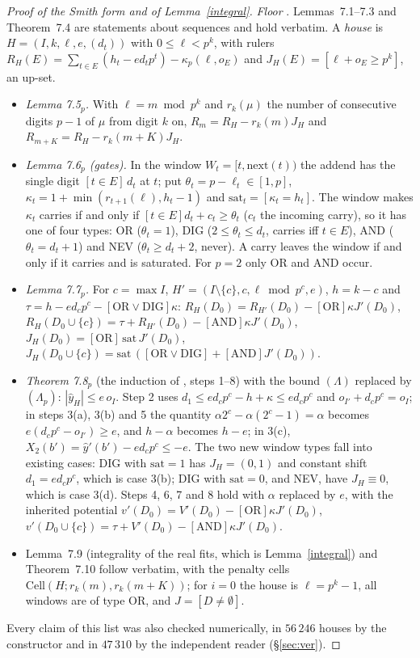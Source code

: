 \documentclass[10pt]{article}
\theoremstyle{ds}
\theoremstyle{dsrem}
\begin{document}
\begin{proof}[Proof of the Smith form and of Lemma~\ref{integral}]
\emph{Floor} \cite[\S7]{DST}. Lemmas~7.1--7.3 and Theorem~7.4 are statements about sequences and hold verbatim. A \emph{house} is $H=(I,k,\ell,e,(d_t))$ with $0\le\ell<p^k$, with rulers $R_H(E)=\sum_{t\in E}(h_t-ed_tp^t)-\kappa_p(\ell,o_E)$ and $J_H(E)=[\ell+o_E\ge p^k]$, an up-set.
\begin{itemize}
\item \emph{Lemma 7.5$_p$.} With $\ell=m\bmod p^k$ and $r_k(\mu)$ the number of consecutive digits $p-1$ of $\mu$ from digit $k$ on, $R_m=R_H-r_k(m)J_H$ and $R_{m+K}=R_H-r_k(m+K)J_H$.
\item \emph{Lemma 7.6$_p$ (gates).} In the window $W_t=[t,\mathrm{next}(t))$ the addend has the single digit $[t\in E]\,d_t$ at $t$; put $\theta_t=p-\ell_t\in[1,p]$, $\kappa_t=1+\min(r_{t+1}(\ell),h_t-1)$ and $\mathrm{sat}_t=[\kappa_t=h_t]$. The window makes $\kappa_t$ carries if and only if $[t\in E]d_t+c_t\ge\theta_t$ ($c_t$ the incoming carry), so it has one of four types: OR ($\theta_t=1$), DIG ($2\le\theta_t\le d_t$, carries iff $t\in E$), AND ($\theta_t=d_t+1$) and NEV ($\theta_t\ge d_t+2$, never). A carry leaves the window if and only if it carries and is saturated. For $p=2$ only OR and AND occur.
\item \emph{Lemma 7.7$_p$.} For $c=\max I$, $H'=(I\setminus\{c\},c,\ell\bmod p^c,e)$, $h=k-c$ and $\tau=h-ed_cp^c-[\mathrm{OR}\vee\mathrm{DIG}]\kappa$:
$R_H(D_0)=R_{H'}(D_0)-[\mathrm{OR}]\kappa J'(D_0)$, $R_H(D_0\cup\{c\})=\tau+R_{H'}(D_0)-[\mathrm{AND}]\kappa J'(D_0)$, $J_H(D_0)=[\mathrm{OR}]\,\mathrm{sat}\,J'(D_0)$, $J_H(D_0\cup\{c\})=\mathrm{sat}\,([\mathrm{OR}\vee\mathrm{DIG}]+[\mathrm{AND}]J'(D_0))$.
\item \emph{Theorem 7.8$_p$} (the induction of \cite[Theorem~7.8]{DST}, steps 1--8) with the bound $(\Lambda)$ replaced by $(\Lambda_p)$: $|\hat y_H|\le e\,o_I$. Step 2 uses $d_1\le ed_cp^c-h+\kappa\le ed_cp^c$ and $o_{I'}+d_cp^c=o_I$; in steps 3(a), 3(b) and 5 the quantity $\alpha2^c-\alpha(2^c-1)=\alpha$ becomes $e(d_cp^c-o_{I'})\ge e$, and $h-\alpha$ becomes $h-e$; in 3(c), $X_2(b')=\hat y'(b')-ed_cp^c\le-e$. The two new window types fall into existing cases: DIG with $\mathrm{sat}=1$ has $J_H=(0,1)$ and constant shift $d_1=ed_cp^c$, which is case 3(b); DIG with $\mathrm{sat}=0$, and NEV, have $J_H\equiv0$, which is case 3(d). Steps 4, 6, 7 and 8 hold with $\alpha$ replaced by $e$, with the inherited potential $v'(D_0)=V'(D_0)-[\mathrm{OR}]\kappa J'(D_0)$, $v'(D_0\cup\{c\})=\tau+V'(D_0)-[\mathrm{AND}]\kappa J'(D_0)$.
\item Lemma~7.9 (integrality of the real fits, which is Lemma~\ref{integral}) and Theorem~7.10 follow verbatim, with the penalty cells $\mathrm{Cell}(H;r_k(m),r_k(m+K))$; for $i=0$ the house is $\ell=p^k-1$, all windows are of type OR, and $J=[D\ne\emptyset]$.
\end{itemize}
Every claim of this list was also checked numerically, in $56\,246$ houses by the constructor and in $47\,310$ by the independent reader (\S\ref{sec:ver}).
\end{proof}
\end{document}
